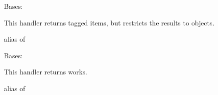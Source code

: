 \documentclass[letterpaper,10pt,english]{sphinxmanual}
\begin{document}

\begin{fulllineitems}
\label{generated/apps.profiles.handlers:apps.profiles.handlers.TaggedWorkHandler}
Bases: 

This handler returns tagged items, but restricts the results to  objects.


\begin{fulllineitems}
\label{generated/apps.profiles.handlers:apps.profiles.handlers.TaggedWorkHandler.model}
alias of 

\end{fulllineitems}



\begin{fulllineitems}
\label{generated/apps.profiles.handlers:apps.profiles.handlers.TaggedWorkHandler.queryset}
\end{fulllineitems}


\end{fulllineitems}



\begin{fulllineitems}
\label{generated/apps.profiles.handlers:apps.profiles.handlers.WorkHandler}
Bases: 

This handler returns works.


\begin{fulllineitems}
\label{generated/apps.profiles.handlers:apps.profiles.handlers.WorkHandler.model}
alias of 

\end{fulllineitems}


\end{fulllineitems}


\end{document}
